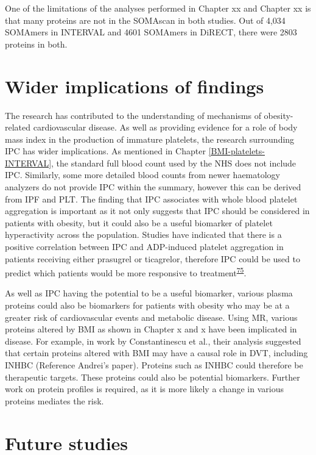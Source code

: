 \documentclass[11pt,twoside]{bristolthesis}
\begin{document}
One of the limitations of the analyses performed in Chapter xx and Chapter xx is that many proteins are not in the SOMAscan in both studies. Out of 4,034 SOMAmers in INTERVAL and 4601 SOMAmers in DiRECT, there were 2803 proteins in both.

\hypertarget{wider-implications-of-findings}{%
\section{Wider implications of findings}\label{wider-implications-of-findings}}

The research has contributed to the understanding of mechanisms of obesity-related cardiovascular disease. As well as providing evidence for a role of body mass index in the production of immature platelets, the research surrounding IPC has wider implications. As mentioned in Chapter \ref{BMI-platelets-INTERVAL}, the standard full blood count used by the NHS does not include IPC. Similarly, some more detailed blood counts from newer haematology analyzers do not provide IPC within the summary, however this can be derived from IPF and PLT. The finding that IPC associates with whole blood platelet aggregation is important as it not only suggests that IPC should be considered in patients with obesity, but it could also be a useful biomarker of platelet hyperactivity across the population. Studies have indicated that there is a positive correlation between IPC and ADP-induced platelet aggregation in patients receiving either prasugrel or ticagrelor, therefore IPC could be used to predict which patients would be more responsive to treatment\textsuperscript{\protect\hyperlink{ref-Bernlochner2015a}{75}}.

As well as IPC having the potential to be a useful biomarker, various plasma proteins could also be biomarkers for patients with obesity who may be at a greater risk of cardiovascular events and metabolic disease. Using MR, various proteins altered by BMI as shown in Chapter x and x have been implicated in disease. For example, in work by Constantinescu et al., their analysis suggested that certain proteins altered with BMI may have a causal role in DVT, including INHBC (Reference Andrei's paper). Proteins such as INHBC could therefore be therapeutic targets. These proteins could also be potential biomarkers. Further work on protein profiles is required, as it is more likely a change in various proteins mediates the risk.

\hypertarget{future-studies}{%
\section{Future studies}\label{future-studies}}
\end{document}

